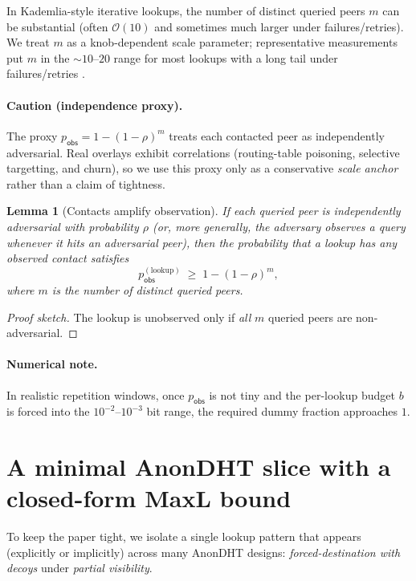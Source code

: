 \documentclass[11pt]{article}
\newtheorem{lemma}{Lemma}
\begin{document}
In Kademlia-style iterative lookups, the number of distinct queried peers $m$ can be substantial (often $\mathcal O(10)$ and sometimes much larger under failures/retries).
We treat $m$ as a knob-dependent scale parameter; representative measurements put $m$ in the $\sim 10$--$20$ range for most lookups with a long tail under failures/retries \cite{ipfs_kad_spec,cortes2024kadlimits,probelab_rfm17,trautwein2024ipfs}.

\paragraph{Caution (independence proxy).} The proxy $p_{\mathsf{obs}}=1-(1-\rho)^m$ treats each contacted peer as independently adversarial. Real overlays exhibit correlations (routing-table poisoning, selective targetting, and churn), so we use this proxy only as a conservative \emph{scale anchor} rather than a claim of tightness.






\begin{lemma}[Contacts amplify observation]\label{lem:contacts_amplify}
If each queried peer is independently adversarial with probability $\rho$ (or, more generally, the adversary observes a query whenever it hits an adversarial peer), then the probability that a lookup has \emph{any} observed contact satisfies
\[
p_{\mathsf{obs}}^{(\mathrm{lookup})}\;\ge\; 1-(1-\rho)^m,
\]
where $m$ is the number of distinct queried peers.
\end{lemma}
\begin{proof}[Proof sketch]
The lookup is unobserved only if \emph{all} $m$ queried peers are non-adversarial.
\end{proof}

\paragraph{Numerical note.} In realistic repetition windows, once $p_{\mathsf{obs}}$ is not tiny and the per-lookup budget $b$ is forced into the $10^{-2}$--$10^{-3}$ bit range, the required dummy fraction approaches $1$.
\cite{series:bossfightBaddendum}







\section{A minimal AnonDHT slice with a closed-form MaxL bound}\label{sec:minislice}
To keep the paper tight, we isolate a single lookup pattern that appears (explicitly or implicitly) across many AnonDHT designs:
\emph{forced-destination with decoys} under \emph{partial visibility}.
\end{document}
